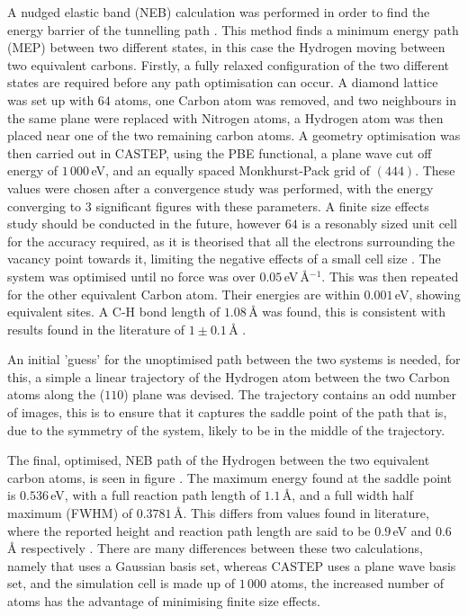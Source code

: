 \documentclass[10pt,a4paper,twocolumn,twoside]{extarticle}
\begin{document}
A nudged elastic band (NEB) calculation was performed in order to find the energy barrier of the tunnelling path \cite{NEB}.
This method finds a minimum energy path (MEP) between two different states, in this case the Hydrogen moving between two equivalent carbons.
Firstly, a fully relaxed configuration of the two different states are required before any path optimisation can occur.
A diamond lattice was set up with $64$ atoms, one Carbon atom was removed, and two neighbours in the same plane were replaced with Nitrogen atoms, a Hydrogen atom was then placed near one of the two remaining carbon atoms. A geometry optimisation was then carried out in CASTEP, using the PBE functional, a plane wave cut off energy of $1\,000$\,eV, and an equally spaced Monkhurst-Pack grid of $(4 4 4)$. These values were chosen after a convergence study was performed, with the energy converging to 3 significant figures with these parameters. A finite size effects study should be conducted in the future, however $64$ is a resonably sized unit cell for the accuracy required, as it is theorised that all the electrons surrounding the vacancy point towards it, limiting the negative effects of a small cell size \cite{NVCage}. The system was optimised until no force was over $0.05$\,eV\,\AA$^{-1}$. This was then repeated for the other equivalent Carbon atom. Their energies are within $0.001$\,eV, showing equivalent sites. A C-H bond length of $1.08$\,{\AA} was found, this is consistent with results found in the literature of $1 \pm 0.1$\,{\AA} \cite{N2VH_CH_Bond}.

An initial 'guess' for the unoptimised path between the two systems is needed, for this, a simple a linear trajectory of the Hydrogen atom between the two Carbon atoms along the ($110$) plane was devised. The trajectory contains an odd number of images, this is to ensure that it captures the saddle point of the path that is, due to the symmetry of the system, likely to be in the middle of the trajectory. 

The final, optimised, NEB path of the Hydrogen between the two equivalent carbon atoms, is seen in figure . The maximum energy found at the saddle point is $0.536$\,eV, with a full reaction path length of $1.1$\,\AA, and a full width half maximum (FWHM) of $0.3781$\,\AA. This differs from values found in literature, where the reported height and reaction path length are said to be $0.9$\,eV and $0.6$\,{\AA} respectively \cite{Peaker}. There are many differences between these two calculations, namely that \textcite{Peaker} uses a Gaussian basis set, whereas CASTEP uses a plane wave basis set, and the simulation cell is made up of $1\,000$ atoms, the increased number of atoms has the advantage of minimising finite size effects. 
\end{document}
